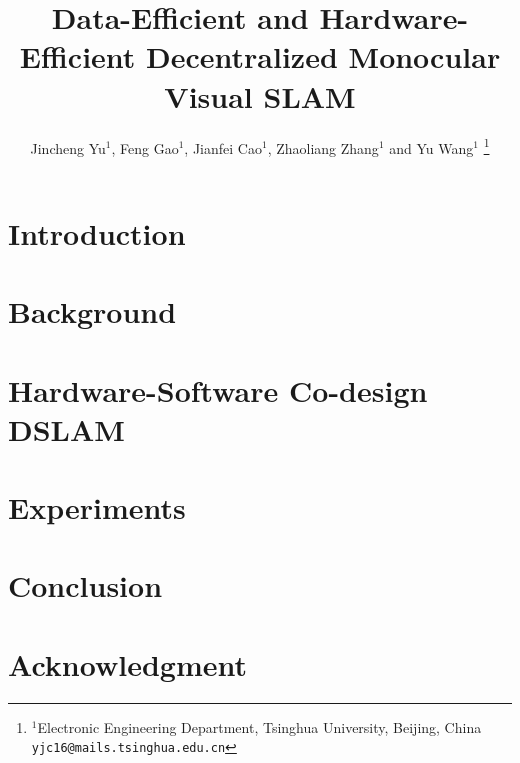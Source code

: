 \documentclass[letterpaper, 10 pt, conference]{ieeeconf}  %
\title{\LARGE \bf
Data-Efficient and Hardware-Efficient Decentralized Monocular Visual {SLAM}
}
\author{Jincheng Yu$^{1}$, Feng Gao$^{1}$, Jianfei Cao$^{1}$, Zhaoliang Zhang$^{1}$ and Yu Wang$^{1}$ %
\thanks{$^{1}$Electronic Engineering Department,
        Tsinghua University, Beijing, China
        {\tt\small yjc16@mails.tsinghua.edu.cn}}%
}
\begin{document}
\maketitle
\thispagestyle{empty}
\pagestyle{empty}


\begin{abstract}

\end{abstract}

\section{Introduction}


\section{Background}



\section{Hardware-Software Co-design DSLAM}



\section{Experiments}


\section{Conclusion}



\section*{Acknowledgment}





\end{document}
